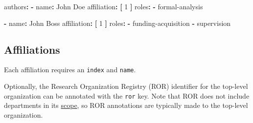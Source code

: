 \documentclass[10pt,a4paper,onecolumn]{article}
\newenvironment{Shaded}{}{}
\newcommand{\AttributeTok}[1]{\textcolor[rgb]{0.49,0.56,0.16}{#1}}
\newcommand{\DecValTok}[1]{\textcolor[rgb]{0.25,0.63,0.44}{#1}}
\newcommand{\FunctionTok}[1]{\textcolor[rgb]{0.02,0.16,0.49}{#1}}
\newcommand{\KeywordTok}[1]{\textcolor[rgb]{0.00,0.44,0.13}{\textbf{#1}}}
\newcommand{\StringTok}[1]{\textcolor[rgb]{0.25,0.44,0.63}{#1}}
\begin{document}
\begin{Shaded}
\begin{Highlighting}[]
\FunctionTok{authors}\KeywordTok{:}
\AttributeTok{  }\KeywordTok{{-}}\AttributeTok{ }\FunctionTok{name}\KeywordTok{:}\AttributeTok{ John Doe}
\AttributeTok{    }\FunctionTok{affiliation}\KeywordTok{:}\AttributeTok{ }\KeywordTok{[}\AttributeTok{ }\DecValTok{1}\AttributeTok{ }\KeywordTok{]}
\AttributeTok{    }\FunctionTok{roles}\KeywordTok{:}
\AttributeTok{      }\KeywordTok{{-}}\AttributeTok{ }\StringTok{\textquotesingle{}formal{-}analysis\textquotesingle{}}

\AttributeTok{  }\KeywordTok{{-}}\AttributeTok{ }\FunctionTok{name}\KeywordTok{:}\AttributeTok{ John Boss}
\AttributeTok{    }\FunctionTok{affiliation}\KeywordTok{:}\AttributeTok{ }\KeywordTok{[}\AttributeTok{ }\DecValTok{1}\AttributeTok{ }\KeywordTok{]}
\AttributeTok{    }\FunctionTok{roles}\KeywordTok{:}
\AttributeTok{      }\KeywordTok{{-}}\AttributeTok{ }\StringTok{\textquotesingle{}funding{-}acquisition\textquotesingle{}}
\AttributeTok{      }\KeywordTok{{-}}\AttributeTok{ }\StringTok{\textquotesingle{}supervision\textquotesingle{}}
\end{Highlighting}
\end{Shaded}

\subsection{Affiliations}\label{affiliations}

Each affiliation requires an \texttt{index} and \texttt{name}.

Optionally, the Research Organization Registry (ROR) identifier for the
top-level organization can be annotated with the \texttt{ror} key. Note
that ROR does not include departments in its
\href{https://ror.org/registry/\#scope-and-criteria-for-inclusion}{scope},
so ROR annotations are typically made to the top-level organization.
\end{document}
